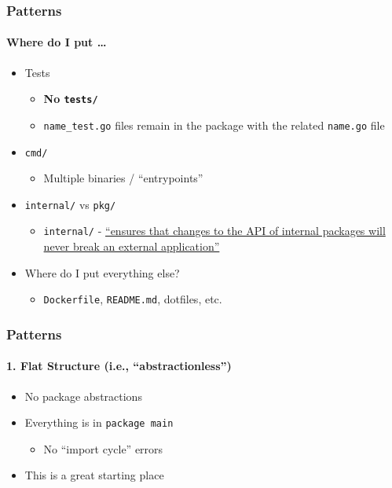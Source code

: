 \begin{frame}[fragile]
  \frametitle{Patterns}
  \framesubtitle{Where do I put \dots}

  \begin{itemize}
    \item{Tests}
    \begin{itemize}
      \item \textbf{No \texttt{tests/}}
      \item \texttt{name\_test.go} files remain in the package with the related \texttt{name.go} file
    \end{itemize}
    \item \texttt{cmd/}
      \begin{itemize}
        \item Multiple binaries / ``entrypoints''
      \end{itemize}
    \item \texttt{internal/} vs \texttt{pkg/}
      \begin{itemize}
        \item \texttt{internal/} - \href{https://blog.gopheracademy.com/advent-2016/go-and-package-focused-design/}{``ensures that changes to the API of internal packages will never break an external application''}
      \end{itemize}
    \item Where do I put everything else?
      \begin{itemize}
        \item \texttt{Dockerfile}, \texttt{README.md}, dotfiles, etc.
      \end{itemize}
  \end{itemize}
\end{frame}

\begin{frame}[fragile]
  \frametitle{Patterns}
  \framesubtitle{1. Flat Structure (i.e., ``abstractionless'')}

  \begin{itemize}
    \item No package abstractions
    \pause
    \item Everything is in \texttt{package main}
    \begin{itemize}
      \item No ``import cycle'' errors
    \end{itemize}
    \pause
    \item This is a great starting place
  \end{itemize}
\end{frame}

